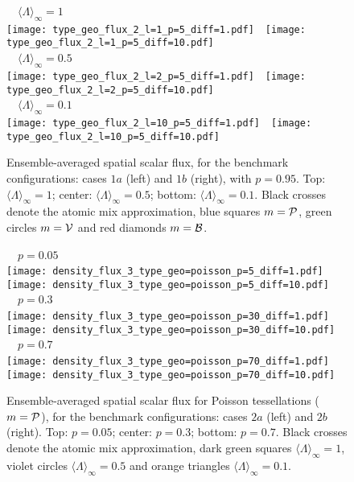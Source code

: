 \documentclass[final,authoryear,5p,times,twocolumn]{elsarticle}
\begin{document}
\begin{figure*}
\begin{center}
\,\,\,\, ${\langle \Lambda \rangle}_{\infty} =1$ \,\,\,\,\\
\texttt{[image: type\_geo\_flux\_2\_l=1\_p=5\_diff=1.pdf]}\,\,\,\,
\texttt{[image: type\_geo\_flux\_2\_l=1\_p=5\_diff=10.pdf]}\\
\,\,\,\, ${\langle \Lambda \rangle}_{\infty} =0.5$ \,\,\,\,\\
\texttt{[image: type\_geo\_flux\_2\_l=2\_p=5\_diff=1.pdf]}\,\,\,\,
\texttt{[image: type\_geo\_flux\_2\_l=2\_p=5\_diff=10.pdf]}\\
\,\,\,\, ${\langle \Lambda \rangle}_{\infty} =0.1$ \,\,\,\,\\
\texttt{[image: type\_geo\_flux\_2\_l=10\_p=5\_diff=1.pdf]}\,\,\,\,
\texttt{[image: type\_geo\_flux\_2\_l=10\_p=5\_diff=10.pdf]}\\
\end{center}
\caption{Ensemble-averaged spatial scalar flux, for the benchmark configurations: cases $1a$ (left) and $1b$ (right), with $p=0.95$. Top: ${\langle \Lambda \rangle}_{\infty}=1$; center: ${\langle \Lambda \rangle}_{\infty}=0.5$; bottom: ${\langle \Lambda \rangle}_{\infty}=0.1$. Black crosses denote the atomic mix approximation, blue squares $m={\cal P}$, green circles $m={\cal V}$ and red diamonds $m={\cal B}$.}
\label{models_2_5}
\end{figure*}

\begin{figure*}
\begin{center}
\,\,\,\, $p=0.05$ \,\,\,\,\\
\texttt{[image: density\_flux\_3\_type\_geo=poisson\_p=5\_diff=1.pdf]}\,\,\,\,
\texttt{[image: density\_flux\_3\_type\_geo=poisson\_p=5\_diff=10.pdf]}\\
\,\,\,\, $p=0.3$ \,\,\,\,\\
\texttt{[image: density\_flux\_3\_type\_geo=poisson\_p=30\_diff=1.pdf]}\,\,\,\,
\texttt{[image: density\_flux\_3\_type\_geo=poisson\_p=30\_diff=10.pdf]}\\
\,\,\,\, $p=0.7$ \,\,\,\,\\
\texttt{[image: density\_flux\_3\_type\_geo=poisson\_p=70\_diff=1.pdf]}\,\,\,\,
\texttt{[image: density\_flux\_3\_type\_geo=poisson\_p=70\_diff=10.pdf]}\\
\end{center}
\caption{Ensemble-averaged spatial scalar flux for Poisson tessellations ($m={\cal P}$), for the benchmark configurations: cases $2a$ (left) and $2b$ (right). Top: $p=0.05$; center: $p=0.3$; bottom: $p=0.7$. Black crosses denote the atomic mix approximation, dark green squares ${\langle \Lambda \rangle}_{\infty}=1$, violet circles ${\langle \Lambda \rangle}_{\infty}=0.5$ and orange triangles ${\langle \Lambda \rangle}_{\infty}=0.1$.}
\label{density_3}
\end{figure*}
\end{document}
